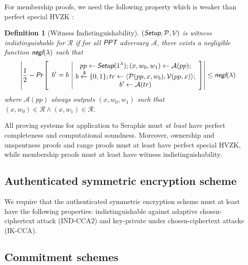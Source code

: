 \documentclass{article}
\newtheorem{definition}{Definition}[section]
\begin{document}
For membership proofs, we need the following property which is weaker than perfect special HVZK \cite{groth}:
\begin{definition}[Witness Indistinguishability]
$(\emph{\textsf{Setup}}, \mathcal{P}, \mathcal{V})$ is witness indistinguishable for $\mathcal{R}$ if for all $\emph{\textsf{PPT}}$ adversary $\mathcal{A}$, there exists a negligible function $\emph{\textsf{negl}}(\lambda)$ such that
\begin{align*}
\left| \frac{1}{2} - \emph{\textsf{Pr}}\left[
\begin{array}{c|c}
    \begin{gathered}
        b' = b
    \end{gathered}
    &
    \begin{gathered}
        pp\leftarrow\emph{\textsf{Setup}}(1^{\lambda}); (x, w_0, w_1)\leftarrow\mathcal{A}(pp); \\
        b\xleftarrow{\$}\{0,1\}; tr\leftarrow\langle\mathcal{P}(pp,x,w_b), \mathcal{V}(pp,x)\rangle; \\
        b'\leftarrow\mathcal{A}(tr)
    \end{gathered}
\end{array}
\right]\right|
\le\emph{\textsf{negl}}(\lambda)
\end{align*}
where $\mathcal{A}(pp)$ always outputs $(x,w_0,w_1)$ such that $(x,w_0)\in\mathcal{R}\wedge(x,w_1)\in\mathcal{R}$.
\end{definition}

All proving systems for application to Seraphis must \textit{at least} have perfect completeness and computational soundness. Moreover, ownership and unspentness proofs and range proofs must at least have perfect special HVZK, while membership proofs must at least have witness indistinguishability.

\subsection{Authenticated symmetric encryption scheme}\label{sec-symm}
We require that the authenticated symmetric encryption scheme must at least have the following properties: indistinguishable against adaptive chosen-ciphertext attack (IND-CCA2) and key-private under chosen-ciphertext attacks (IK-CCA).

\subsection{Commitment schemes}\label{Comm}
\end{document}
